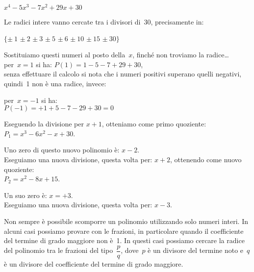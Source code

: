\begin{esempio}
\(x^4-5x^3-7x^2+29x+30\)

Le radici intere vanno cercate tra i divisori di~30, precisamente 
in:
\begin{center}
\(\{\pm~1\) \(\pm~2\) \(\pm~3\) \(\pm~5\) \(\pm~6\) \(\pm~10\)
\(\pm~15\) \(\pm~30\}\)
\end{center}
Sostituiamo questi numeri al posto della~\(x\), finché non troviamo la 
radice\dots\\
per~\(x=1\) si ha: \quad \(P(1)=1-5-7+29+30\), \\
senza effettuare il calcolo si nota 
che i numeri positivi superano quelli negativi, quindi~1 non è una radice,
invece:

{
\scompruffiniad
}
{
per~\(x=-1\) si ha:\\
\(P(-1)=+1+5-7-29+30=0\)

Eseguendo la divisione per \(x+1\), otteniamo come primo quoziente: \\
\(P_1=x^3-6x^2-x+30\).

Uno zero di questo nuovo polinomio è: \(x-2\).\\
Eseguiamo una nuova divisione, questa volta per: \(x+2\),
ottenendo come nuovo quoziente:\\
\(P_2=x^2-8x+15\). 

Un suo zero è: \(x=+3\).\\
Eseguiamo una nuova divisione, questa volta per: \(x-3\).
}
\end{esempio}

Non sempre è possibile scomporre un polinomio utilizzando solo numeri
interi. In alcuni casi possiamo provare con le frazioni, in particolare
quando il coefficiente del termine di grado maggiore non è~1. In
questi casi possiamo cercare la radice del polinomio tra le frazioni
del tipo~\(\dfrac{p}{q}\), dove~\(p\) è un divisore del termine noto e~\(q\) 
è un divisore del coefficiente del termine di grado maggiore.

